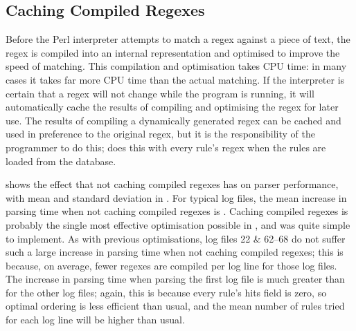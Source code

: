 \subsection{Caching Compiled Regexes}

\label{Caching compiled regexes}

Before the Perl interpreter attempts to match a regex against a piece of
text, the regex is compiled into an internal representation and optimised
to improve the speed of matching.  This compilation and optimisation takes
CPU time: in many cases it takes far more CPU time than the actual
matching.  If the interpreter is certain that a regex will not change while
the program is running, it will automatically cache the results of
compiling and optimising the regex for later use.  The results of compiling
a dynamically generated regex can be cached and used in preference to the
original regex, but it is the responsibility of the programmer to do this;
\parsername{} does this with every rule's regex when the rules are loaded
from the database.

shows the effect that not caching compiled regexes has on parser
performance, with mean and standard deviation in .  For typical log
files, the mean increase in parsing time when not caching compiled regexes
is .  Caching
compiled regexes is probably the single most effective optimisation
possible in \parsername{}, and was quite simple to implement.  As with
previous optimisations, log files 22 \& 62--68 do not suffer such a large
increase in parsing time when not caching compiled regexes; this is
because, on average, fewer regexes are compiled per log line for those log
files.  The increase in parsing time when parsing the first log file is
much greater than for the other log files; again, this is because every
rule's hits field is zero, so optimal ordering is less efficient than
usual, and the mean number of rules tried for each log line will be higher
than usual.



